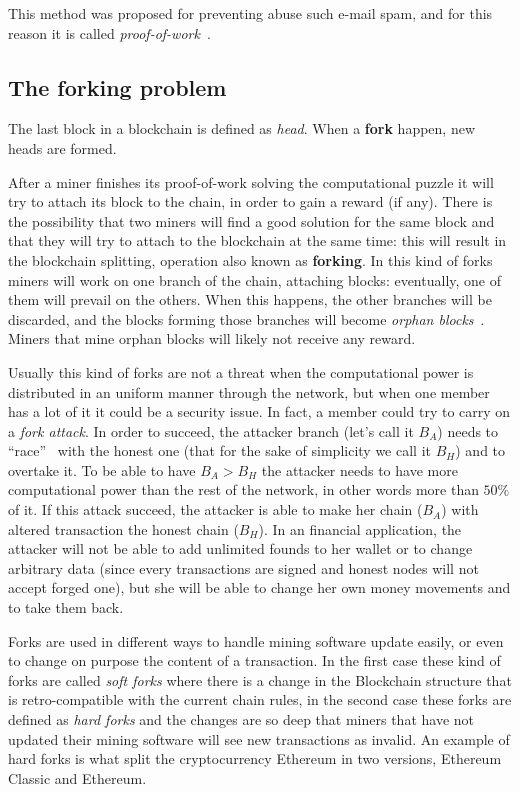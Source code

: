 This method was proposed for preventing abuse such e-mail spam, and for this
reason it is called \textit{proof-of-work}~\cite{back02}.

\subsection{The forking problem}
\label{sub:tfp}

The last block in a blockchain is defined as \textit{head}. When a
\textbf{fork} happen, new heads are formed.

After a miner finishes its proof-of-work solving the computational puzzle
it will try to attach its block to the chain, in order to gain a reward (if
any). There is the possibility that two miners will find a good solution for
the same block and that they will try to attach to the blockchain at the same
time: this will result in the blockchain splitting, operation also known as
\textbf{forking}. In this kind of forks miners will work on one branch of the
chain, attaching blocks: eventually, one of them will prevail on the others.
When this happens, the other branches will be discarded, and the blocks
forming those branches will become \textit{orphan blocks}~\cite{decker13}.
Miners that mine orphan blocks will likely not receive any reward.

Usually this kind of forks are not a threat when the computational power is
distributed in an uniform manner through the network, but when one member has a
lot of it it could be a security issue. In fact, a member could try to carry on
a \textit{fork attack}. In order to succeed, the attacker branch (let's call it
$B_A$) needs to ``race''~\cite{nakamoto08} with the honest one (that for the
sake of simplicity we call it $B_H$) and to overtake it. To be able to have
$B_A > B_H$ the attacker needs to have more computational power than the rest of
the network, in other words more than $50\%$ of it.
If this attack succeed, the attacker is able to make her chain ($B_A$) with
altered transaction the honest chain ($B_H$).
In an financial application, the attacker will not be able to add unlimited
founds to her wallet or to change arbitrary data (since every transactions are
signed and honest nodes will not accept forged one), but she will be able to
change her own money movements and to take them back.

Forks are used in different ways to handle mining software update easily, or
even to change on purpose the content of a transaction\cite{sok15}. In the
first case these kind of forks are called \textit{soft forks} where there is a
change in the Blockchain structure that is retro-compatible with the current
chain rules, in the second case these forks are defined as \textit{hard forks}
and the changes are so deep that miners that have not updated their mining
software will see new transactions as invalid. An example of hard forks is what
split the cryptocurrency Ethereum in two versions, Ethereum Classic and
Ethereum.
